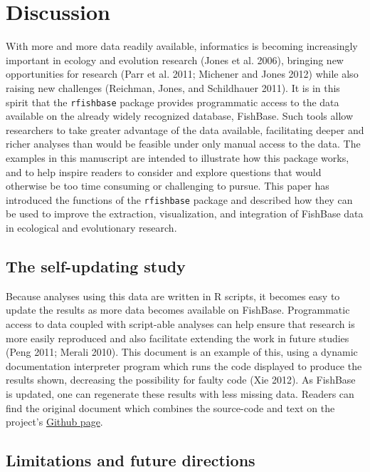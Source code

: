 \documentclass[author-year]{elsarticle} %
\begin{document}
\section{Discussion}

With more and more data readily available, informatics is becoming
increasingly important in ecology and evolution research (Jones et al.
2006), bringing new opportunities for research (Parr et al. 2011;
Michener and Jones 2012) while also raising new challenges (Reichman,
Jones, and Schildhauer 2011). It is in this spirit that the
\texttt{rfishbase} package provides programmatic access to the data
available on the already widely recognized database, FishBase. Such
tools allow researchers to take greater advantage of the data available,
facilitating deeper and richer analyses than would be feasible under
only manual access to the data. The examples in this manuscript are
intended to illustrate how this package works, and to help inspire
readers to consider and explore questions that would otherwise be too
time consuming or challenging to pursue. This paper has introduced the
functions of the \texttt{rfishbase} package and described how they can
be used to improve the extraction, visualization, and integration of
FishBase data in ecological and evolutionary research.

\subsection{The self-updating study}

Because analyses using this data are written in R scripts, it becomes
easy to update the results as more data becomes available on FishBase.
Programmatic access to data coupled with script-able analyses can help
ensure that research is more easily reproduced and also facilitate
extending the work in future studies (Peng 2011; Merali 2010). This
document is an example of this, using a dynamic documentation
interpreter program which runs the code displayed to produce the results
shown, decreasing the possibility for faulty code (Xie 2012). As
FishBase is updated, one can regenerate these results with less missing
data. Readers can find the original document which combines the
source-code and text on the project's
\href{https://github.com/ropensci/rfishbase/tree/master/inst/doc/rfishbase}{Github
page}.

\subsection{Limitations and future directions}
\end{document}

